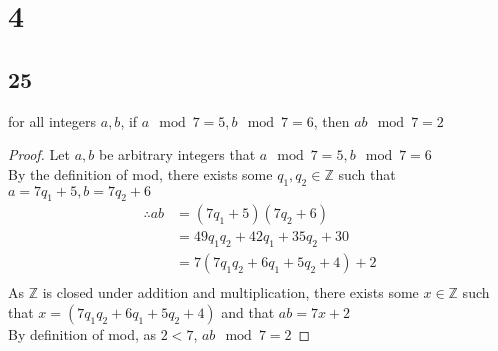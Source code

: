 \documentclass{article}
\begin{document}
\section{4}
\subsection{25}
for all integers $a,b$, if $a \mod 7 = 5, b \mod 7 = 6$, then $ab \mod 7 = 2$\\
\begin{proof}
    Let $a,b$ be arbitrary integers that $a \mod 7 = 5, b \mod 7 = 6$\\
    By the definition of mod, there exists some $q_1,q_2  \in \mathbb{Z}$ such that $a = 7q_1 + 5, b = 7q_2 + 6$
    \begin{align*}
        \therefore
        ab &= (7q_1 + 5)(7q_2 + 6) \tag{By substitution}\\
        &= 49q_1q_2 + 42q_1 + 35q_2 + 30 \\
        &= 7(7q_1q_2 + 6q_1 + 5q_2 + 4) + 2 \tag{By algebra}\\
    \end{align*}
    As $\mathbb{Z}$ is closed under addition and multiplication, there exists some $x \in \mathbb{Z}$ such that $x = (7q_1q_2 + 6q_1 + 5q_2 + 4)$ and that $ab = 7x + 2$\\
    By definition of mod, as $2 < 7$, $ab \mod 7 = 2 $
\end{proof}
\end{document}
